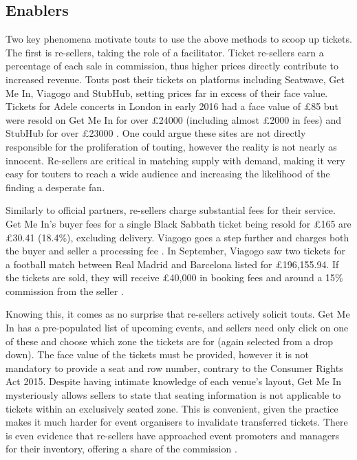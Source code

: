\documentclass[12pt]{bhamdissertation}
\begin{document}
\subsection{Enablers}

Two key phenomena motivate touts to use the above methods to scoop up tickets. The first is re-sellers, taking the role of a facilitator. Ticket re-sellers earn a percentage of each sale in commission, thus higher prices directly contribute to increased revenue. Touts post their tickets on platforms including Seatwave, Get Me In, Viagogo and StubHub, setting prices far in excess of their face value. Tickets for Adele concerts in London in early 2016 had a face value of £85 but were resold on Get Me In for over £24000 (including almost £2000 in fees) and StubHub for over £23000 \autocite{JR16}. One could argue these sites are not directly responsible for the proliferation of touting, however the reality is not nearly as innocent. Re-sellers are critical in matching supply with demand, making it very easy for touters to reach a wide audience and increasing the likelihood of the finding a desperate fan.

Similarly to official partners, re-sellers charge substantial fees for their service. Get Me In's buyer fees for a single Black Sabbath ticket being resold for £165 are £30.41 (18.4\%), excluding delivery. Viagogo goes a step further and charges both the buyer and seller a processing fee \autocite{V16, St13}. In September, Viagogo saw two tickets for a football match between Real Madrid and Barcelona listed for £196,155.94. If the tickets are sold, they will receive £40,000 in booking fees and around a 15\% commission from the seller \autocite{Dav16}.

Knowing this, it comes as no surprise that re-sellers actively solicit touts. Get Me In has a pre-populated list of upcoming events, and sellers need only click on one of these and choose which zone the tickets are for (again selected from a drop down). The face value of the tickets must be provided, however it is not mandatory to provide a seat and row number, contrary to the Consumer Rights Act 2015. Despite having intimate knowledge of each venue's layout, Get Me In mysteriously allows sellers to state that seating information is not applicable to tickets within an exclusively seated zone. This is convenient, given the practice makes it much harder for event organisers to invalidate transferred tickets. There is even evidence that re-sellers have approached event promoters and managers for their inventory, offering a share of the commission \autocite{Da16}.
\end{document}
